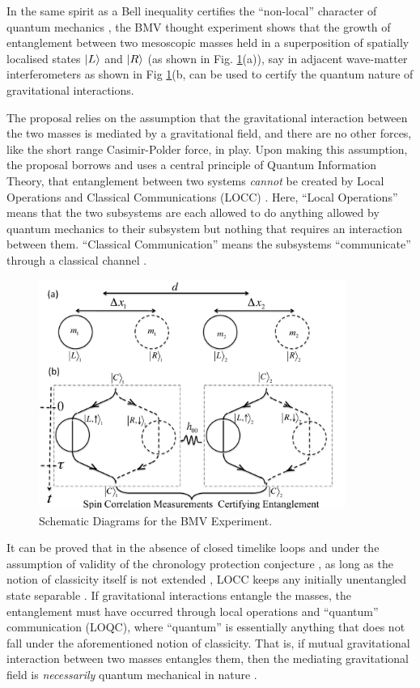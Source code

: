 \documentclass[12pt,a4paper]{report}
\theoremstyle{plain}
\theoremstyle{definition}
\theoremstyle{remark}
\DeclarePairedDelimiter\ket{\lvert}{\rangle}
\begin{document}
In the same spirit as a Bell inequality certifies the ``non-local'' character of quantum mechanics \cite{Bell}, the BMV thought experiment shows that the growth of entanglement between two mesoscopic masses held in a superposition  of spatially localised states $\ket{L}$ and $\ket{R}$ (as shown in Fig. \ref{fig:BMV}(a)\cite{Bose_2017}), say in adjacent wave-matter interferometers as shown in Fig \ref{fig:BMV}(b\cite{Bose_2017}, can be used to certify the quantum nature of gravitational interactions.

The proposal relies on the assumption that the gravitational interaction between the two masses is mediated by a gravitational field, and there are no other forces, like the short range Casimir-Polder force, in play. Upon making this assumption, the proposal borrows and uses a central principle of Quantum Information Theory, that entanglement between two systems \textit{cannot} be created by Local Operations and Classical Communications (LOCC) \cite{RevModPhys.81.865}. Here, ``Local Operations'' means that the two subsystems are each allowed to do anything allowed by quantum mechanics to their subsystem but nothing that requires an interaction between them. ``Classical Communication'' means the subsystems ``communicate'' through a classical channel \cite{Bose_2017}. 

\begin{figure}[ht!]
    \centering
    \includegraphics[width=10cm]{LR_fig.pdf}
    \caption{Schematic Diagrams for the BMV Experiment.}
    \label{fig:BMV}
\end{figure}

It can be proved that in the absence of closed timelike loops \cite{timelike} and under the assumption of validity of the chronology protection conjecture \cite{PhysRevLett.68.267}, as long as the notion of classicity itself is not extended \cite{Hall_2018}, LOCC keeps any initially unentangled state separable \cite{Bose_2017}. If gravitational interactions entangle the masses, the entanglement must have occurred through local operations and ``quantum'' communication (LOQC), where ``quantum'' is essentially anything that does not fall under the aforementioned notion of classicity. That is, if mutual gravitational interaction between two masses entangles them, then the mediating gravitational field is \textit{necessarily} quantum mechanical in nature \cite{Bose_2017}.
\end{document}
